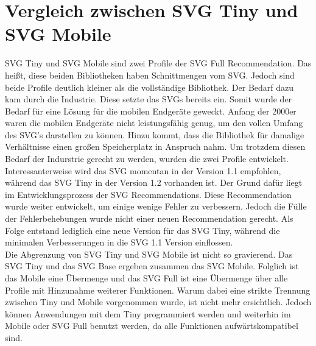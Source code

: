 \section{Vergleich zwischen SVG Tiny und SVG Mobile}
SVG Tiny und SVG Mobile sind zwei Profile der SVG Full Recommendation. Das heißt, diese beiden Bibliotheken haben Schnittmengen vom SVG. Jedoch sind beide Profile deutlich kleiner als die vollständige Bibliothek. Der Bedarf dazu kam durch die Industrie. Diese setzte das SVGs bereits ein. Somit wurde der Bedarf für eine Lösung für die mobilen Endgeräte geweckt. Anfang der 2000er waren die mobilen Endgeräte nicht leistungsfähig genug, um den vollen Umfang des SVG's darstellen zu können. Hinzu kommt, dass die Bibliothek für damalige Verhältnisse einen großen Speicherplatz in Anspruch nahm. Um trotzdem diesen Bedarf der Indurstrie gerecht zu werden, wurden die zwei Profile entwickelt.\\

Interessanterweise wird das SVG momentan in der Version 1.1 empfohlen, während das SVG Tiny in der Version 1.2 vorhanden ist. Der Grund dafür liegt im Entwicklungsprozess der SVG Recommendations. Diese Recommendation wurde weiter entwickelt, um einige wenige Fehler zu verbessern. Jedoch die Fülle der Fehlerbehebungen wurde nicht einer neuen Recommendation gerecht. Als Folge entstand lediglich eine neue Version für das SVG Tiny, während die minimalen Verbesserungen in die SVG 1.1 Version einflossen.\\

Die Abgrenzung von SVG Tiny und SVG Mobile ist nicht so gravierend. Das SVG Tiny und das SVG Base ergeben zusammen das SVG Mobile. Folglich ist das Mobile eine Übermenge und das SVG Full ist eine Übermenge über alle Profile mit Hinzunahme weiterer Funktionen. Warum dabei eine strikte Trennung zwischen Tiny und Mobile vorgenommen wurde, ist nicht mehr ersichtlich. Jedoch können Anwendungen mit dem Tiny programmiert werden und weiterhin im Mobile oder SVG Full benutzt werden, da alle Funktionen aufwärtskompatibel sind.\\

